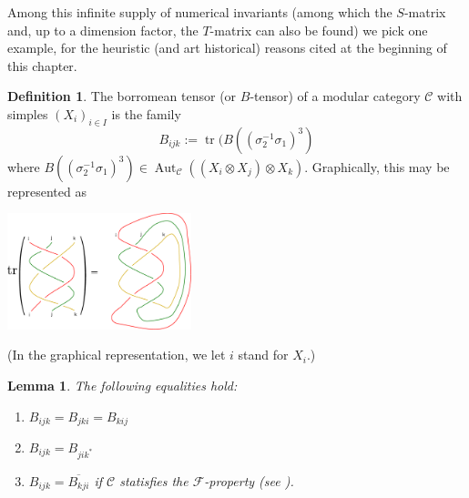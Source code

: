 \documentclass[11pt]{book}
\newtheorem{Lem}[theorem]{Lemma}
\theoremstyle{Rem}
\theoremstyle{definition}
\newtheorem{Def}[theorem]{Definition}
\numberwithin{equation}{section}
\newcommand\tr{\operatorname{tr}}
\newcommand\inv{^{-1}}
\newcommand\ot{\otimes}
\newcommand\Aut{\operatorname{Aut}}
\newcommand\C{\mathcal C}
\begin{document}
Among this infinite supply of numerical invariants (among which the $S$-matrix and, up to a dimension factor, the $T$-matrix can also be found) we pick one example, for the heuristic (and art historical) reasons cited at the beginning of this chapter.

\begin{Def}
  The borromean tensor (or $B$-tensor) of a modular category $\C$ with simples $(X_i)_{i\in I}$ is the family
  \begin{equation}
    \label{eq:borromeo}
    B_{ijk}:=\tr(B((\sigma_2\inv\sigma_1)^3)
  \end{equation}
  where $B((\sigma_2\inv\sigma_1)^3)\in\Aut_{\C}((X_i\ot X_j)\ot X_k)$. Graphically, this may be represented as 
\begin{center}
\includegraphics[width=0.4\textwidth]{b-braid.eps}
\end{center}


(In the graphical representation, we let $i$ stand for $X_i$.)
\end{Def}
\begin{Lem}
 The following equalities hold:
\begin{enumerate}
\item
$B_{ijk}=B_{jki}=B_{kij}$
\item
$B_{ijk}=B_{jik^{\ast}}$
\item
$B_{ijk}=\overline{B_{kji}}$ if $\C$ statisfies the $\mathcal F$-property (see \cite{MR2832261}).
\end{enumerate}
\end{Lem}
\end{document}
